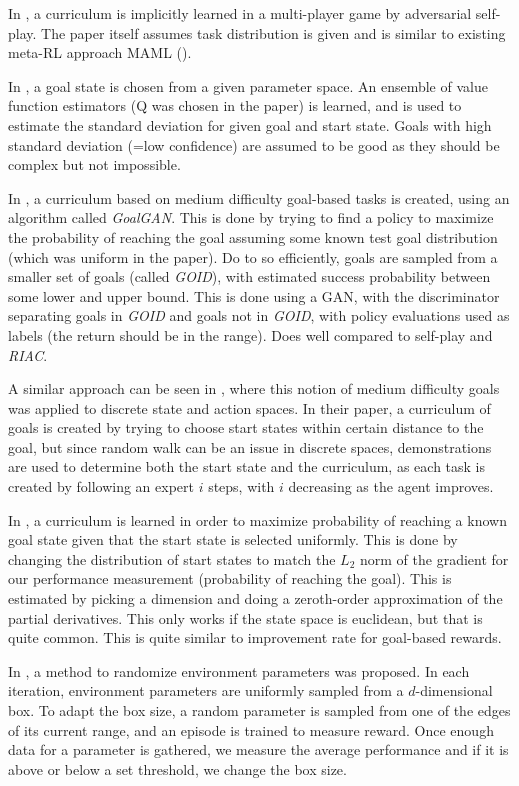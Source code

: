 \documentclass[letterpaper]{article}
\theoremstyle{definition}
\begin{document}
In \cite{Al-Shedivat2017}, a curriculum is implicitly learned in a multi-player game by adversarial self-play. The paper itself assumes task distribution is given and is similar to existing meta-RL approach MAML (\cite{Finn2017a}).

In \cite{Zhang2020}, a goal state is chosen from a given parameter space. An ensemble of value function estimators (Q was chosen in the paper) is learned, and is used to estimate the standard deviation for given goal and start state. Goals with high standard deviation (=low confidence) are assumed to be good as they should be complex but not impossible.

In \cite{Florensa2017, Florensa2018}, a curriculum based on medium difficulty goal-based tasks is created, using an algorithm called \textit{GoalGAN}. This is done by trying to find a policy to maximize the probability of reaching the goal assuming some known test goal distribution (which was uniform in the paper). Do to so efficiently, goals are sampled from a smaller set of goals (called \textit{GOID}), with estimated success probability between some lower and upper bound. This is done using a GAN, with the discriminator separating goals in \textit{GOID} and goals not in \textit{GOID}, with policy evaluations used as labels (the return should be in the range). Does well compared to self-play and \textit{RIAC}.

A similar approach can be seen in \cite{Srinivasan2019}, where this notion of medium difficulty goals was applied to discrete state and action spaces. In their paper, a curriculum of goals is created by trying to choose start states within certain distance to the goal, but since random walk can be an issue in discrete spaces, demonstrations are used to determine both the start state and the curriculum, as each task is created by following an expert $i$ steps, with $i$ decreasing as the agent improves.

In \cite{Wohlke2020}, a curriculum is learned in order to maximize probability of reaching a known goal state given that the start state is selected uniformly. This is done by changing the distribution of start states to match the $L_2$ norm of the gradient for our performance measurement (probability of reaching the goal). This is estimated by picking a dimension and doing a zeroth-order approximation of the partial derivatives. This only works if the state space is euclidean, but that is quite common. This is quite similar to improvement rate for goal-based rewards.

In \cite{Akkaya2019}, a method to randomize environment parameters was proposed. In each iteration, environment parameters are uniformly sampled from a $d$-dimensional box. To adapt the box size, a random parameter is sampled from one of the edges of its current range, and an episode is trained to measure reward. Once enough data for a parameter is gathered, we measure the average performance and if it is above or below a set threshold, we change the box size. 
\end{document}
